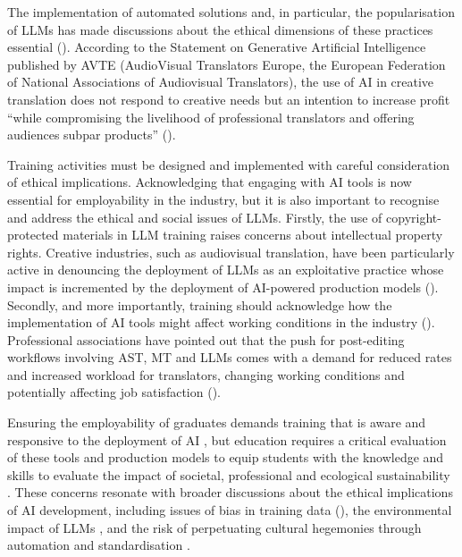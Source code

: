 \documentclass[output=paper]{langscibook}
\begin{document}
The implementation of automated solutions and, in particular, the popularisation of LLMs has made discussions about the ethical dimensions of these practices essential (\citealt{moorkens2020tiny, moorkens2024i-am-not-a-number}). According to the Statement on Generative Artificial Intelligence published by AVTE (AudioVisual Translators Europe, the European Federation of National Associations of Audiovisual Translators), the use of AI in creative translation does not respond to creative needs but an intention to increase profit “while compromising the livelihood of professional translators and offering audiences subpar products” (\citealt[5]{AVTE2024}).

Training activities must be designed and implemented with careful consideration of ethical implications. Acknowledging that engaging with AI tools is now essential for employability in the industry, but it is also important to recognise and address the ethical and social issues of LLMs. Firstly, the use of copyright-protected materials in LLM training raises concerns about intellectual property rights. Creative industries, such as audiovisual translation, have been particularly active in denouncing the deployment of LLMs as an exploitative practice whose impact is incremented by the deployment of AI-powered production models (\citealt{AVTE2024, ATRAE2021, enchairetenos2024traductions}). Secondly, and more importantly, training should acknowledge how the implementation of AI tools might affect working conditions in the industry (\citealt{AVTE2023, karakanta2022post-editing, koponen2020mt}). Professional associations have pointed out that the push for post-editing workflows involving AST, MT and LLMs comes with a demand for reduced rates and increased workload for translators, changing working conditions and potentially affecting job satisfaction (\citealt{docarmo2020_timemoney, sakamoto2024measuring}).

Ensuring the employability of graduates demands training that is aware and responsive to the deployment of AI \citep{emt_european_2022}, but education requires a critical evaluation of these tools and production models to equip students with the knowledge and skills to evaluate the impact of societal, professional and ecological sustainability \citep{moorkens2024_triple}. These concerns resonate with broader discussions about the ethical implications of AI development, including issues of bias in training data (\citealt{akaosman2021, johnson2022ghost}), the environmental impact of LLMs \citep{luccioni2023stable}, and the risk of perpetuating cultural hegemonies through automation and standardisation \citep{benderetal2021_parrots}.
\end{document}
